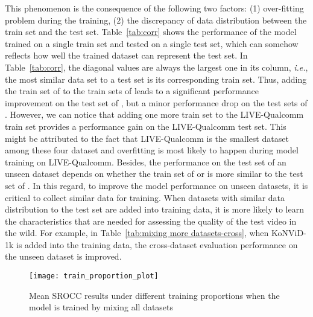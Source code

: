\documentclass[twocolumn]{svjour3}          \smartqed  \usepackage{graphicx}
\begin{document}
This phenomenon is the consequence of the following two factors: (1) over-fitting problem during the training, (2) the discrepancy of data distribution between the train set and the test set.
Table~\ref{tab:corr} shows the performance of the model trained on a single train set and tested on a single test set, which can somehow reflects how well the trained dataset can represent the test set.
In Table~\ref{tab:corr}, the diagonal values are always the largest one in its column, \textit{i.e.}, the most similar data set to a test set is its corresponding train set.
Thus, adding the train set of  to the train sets of  leads to a significant performance improvement on the test set of , but a minor performance drop on the test sets of .
However, we can notice that adding one more train set to the LIVE-Qualcomm train set provides a performance gain on the LIVE-Qualcomm test set.
This might be attributed to the fact that LIVE-Qualcomm is the smallest dataset among these four dataset and overfitting is most likely to happen during model training on LIVE-Qualcomm.
Besides, the performance on the test set of an unseen dataset  depends on whether the train set of  or  is more similar to the test set of .
In this regard, to improve the model performance on unseen datasets, it is critical to collect similar data for training.
When datasets with similar data distribution to the test set are added into training data, it is more likely to learn the characteristics that are needed for assessing the quality of the test video in the wild. 
For example, in Table~\ref{tab:mixing more datasets-cross}, when KoNViD-1k is added into the training data, the cross-dataset evaluation performance on the unseen dataset is improved.





\begin{figure}[!htb]
    \centering
    \texttt{[image: train\_proportion\_plot]}
    \caption{Mean SROCC results under different training proportions when the model is trained by mixing all datasets}
    \label{fig:train proportion}
\end{figure}
\end{document}
